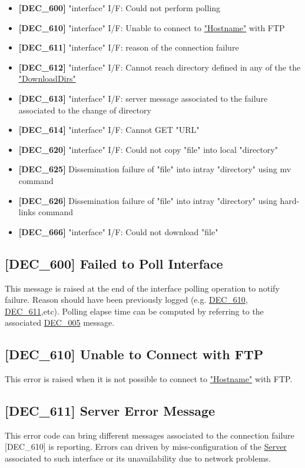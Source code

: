 \documentclass[dec_sum_main.tex]{subfiles}
\begin{document}
\begin{itemize}
	\item \textbf{[DEC\_600]} "interface" I/F: Could not perform polling
	\item \textbf{[DEC\_610]} "interface" I/F: Unable to connect to \hyperref[Config_Server]{"Hostname"} with FTP
	\item \textbf{[DEC\_611]} "interface" I/F: reason of the connection failure
	\item \textbf{[DEC\_612]} "interface" I/F: Cannot reach directory defined in any of the the \hyperref[DownloadDirs]{"DownloadDirs"}
	\item \textbf{[DEC\_613]} "interface" I/F: server message associated to the failure associated to the change of directory
	\item \textbf{[DEC\_614]} "interface" I/F: Cannot GET "URL"
	\item \textbf{[DEC\_620]} "interface" I/F: Could not copy "file" into local
"directory"
	\item \textbf{[DEC\_625]} Dissemination failure of "file" into intray
"directory" using mv command
	\item \textbf{[DEC\_626]} Dissemination failure of "file" into intray
"directory" using hard-links command
	\item \textbf{[DEC\_666]} "interface" I/F: Could not download "file"
\end{itemize}


\subsection{[DEC\_600] Failed to Poll Interface}
\label{DEC600}
This message is raised at the end of the interface polling operation to notify failure. Reason should have been previously logged (e.g. \hyperref[DEC610]{DEC\_610}, \hyperref[DEC611]{DEC\_611},etc). Polling elapse time can be computed by referring to the associated \hyperref[DEC005]{DEC\_005} message. 

\subsection{[DEC\_610] Unable to Connect with FTP}
\label{DEC610}
This error is raised when it is not possible to connect to \hyperref[Config_Server]{"Hostname"} with FTP.

\subsection{[DEC\_611] Server Error Message}
\label{DEC611}
This error code can bring different messages associated to the connection failure [DEC\_610] is reporting. Errors can driven by miss-configuration of the \hyperref[Config_Server]{Server} associated to such interface or its unavailability due to network problems.
\end{document}
